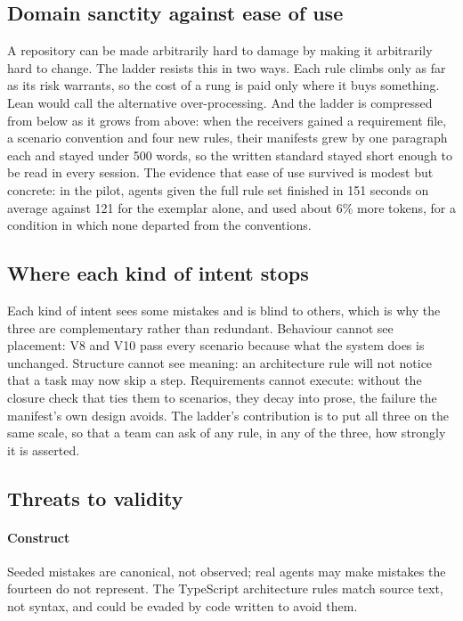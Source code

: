 \subsection{Domain sanctity against ease of use}

A repository can be made arbitrarily hard to damage by making it arbitrarily hard to change.
The ladder resists this in two ways. Each rule climbs only as far as its risk warrants, so the
cost of a rung is paid only where it buys something. Lean would call the alternative
over-processing. And the ladder is compressed from below as
it grows from above: when the receivers gained a requirement file, a scenario convention and
four new rules, their manifests grew by one paragraph each and stayed under 500 words, so the
written standard stayed short enough to be read in every session. The
evidence that ease of use survived is modest but concrete: in the pilot, agents given the full
rule set finished in 151 seconds on average against 121 for the exemplar alone, and used about
6\% more tokens, for a condition in which none departed from the conventions.

\subsection{Where each kind of intent stops}

Each kind of intent sees some mistakes and is blind to others, which is why the three are
complementary rather than redundant. Behaviour cannot see placement: V8 and V10 pass every
scenario because what the system does is unchanged. Structure cannot see meaning: an
architecture rule will not notice that a task may now skip a step. Requirements cannot execute:
without the closure check that ties them to scenarios, they decay into prose, the failure the
manifest's own design avoids. The ladder's contribution is to put all three on the same scale,
so that a team can ask of any rule, in any of the three, how strongly it is asserted.

\subsection{Threats to validity}

\paragraph{Construct} Seeded mistakes are canonical, not observed; real agents may make
mistakes the fourteen do not represent. The TypeScript architecture rules match source text, not
syntax, and could be evaded by code written to avoid them.

